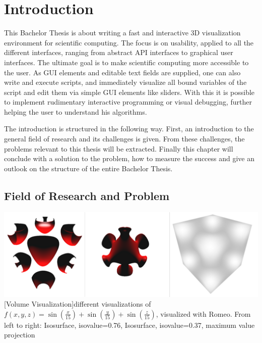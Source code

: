 \section{Introduction}
This Bachelor Thesis is about writing a fast and interactive 3D visualization environment for scientific computing. 
The focus is on usability, applied to all the different interfaces, ranging from abstract API interfaces to graphical user interfaces. 
The ultimate goal is to make scientific computing more accessible to the user.
As GUI elements and editable text fields are supplied, one can also write and execute scripts, and immediately visualize all bound variables of the script and edit them via simple GUI elements like sliders. 
With this it is possible to implement rudimentary interactive programming or visual debugging, further helping the user to understand his algorithms.

The introduction is structured in the following way.
First, an introduction to the general field of research and its challenges is given. 
From these challenges, the problems relevant to this thesis will be extracted.
Finally this chapter will conclude with a solution to the problem, how to measure the success and give an outlook on the structure of the entire Bachelor Thesis.
 
\subsection{Field of Research and Problem}

\vspace{1em}
\begin{minipage}{\linewidth}
    \centering
    \includegraphics[width=0.7\linewidth]{graphics/surfaces.png}
    [Volume Visualization]{different visualizations of $f(x,y,z)=\sin(\frac{x}{15})+\sin(\frac{y}{15})+\sin(\frac{z}{15})$, visualized with Romeo. From left to right: Isosurface, isovalue=0.76, Isosurface, isovalue=0.37, maximum value projection}
    \label{fig:volume}
\end{minipage}
\vspace{1em}

